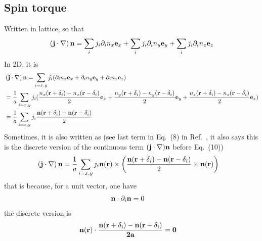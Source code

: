 \documentclass[aps,superscriptaddress,groupedaddress]{revtex4}  %
\begin{document}
\subsection{\label{sec:2.1}Spin torque}
Written in lattice, so that
\begin{equation}
\begin{split}
&\left({\bf j}\cdot \nabla\right) {\bf n}=\sum _i j_i\partial _i n_x{\bf e}_x+\sum _i j_i\partial _i n_y{\bf e}_y+\sum _i j_i\partial _i n_z{\bf e}_z\\
\end{split}
\end{equation}
In 2D, it is
\begin{equation}
\begin{split}
&\left({\bf j}\cdot \nabla\right) {\bf n}= \sum _{i=x,y}j_i(\partial _i n_x{\bf e}_x+ \partial _i n_y{\bf e}_y+\partial _i n_z{\bf e}_z)\\
&=\frac{1}{a}\sum _{i=x,y}j_i(\frac{n_{x}({\bf r}+\delta _i)-n_{x}({\bf r}-\delta _i)}{2}{\bf e}_x+ \frac{n_{y}({\bf r}+\delta _i)-n_{y}({\bf r}-\delta _i)}{2}{\bf e}_y+\frac{n_{z}({\bf r}+\delta _i)-n_{z}({\bf r}-\delta _i)}{2}{\bf e}_z)\\
&=\frac{1}{a}\sum _{i=x,y}j_i\frac{{\bf n}({\bf r}+\delta _i)-{\bf n}({\bf r}-\delta _i)}{2}
\end{split}
\end{equation}
Sometimes, it is also written as (see last term in Eq.~(8) in Ref.~\cite{pin}, it also says this is the discrete version of the continuous term $({\bf j}\cdot \nabla ){\bf n}$ before Eq.~(10))
\begin{equation}
\begin{split}
&\left({\bf j}\cdot \nabla\right) {\bf n}=\frac{1}{a}\sum _{i=x,y}j_i{\bf n}({\bf r})\times \left(\frac{{\bf n}({\bf r}+\delta _i)-{\bf n}({\bf r}-\delta _i)}{2}\times {\bf n}({\bf r})\right)
\end{split}
\end{equation}
that is because, for a unit vector, one have
\begin{equation}
\begin{split}
&{\bf n}\cdot \partial _i {\bf n}=0
\end{split}
\end{equation}
the discrete version is
\begin{equation}
\begin{split}
&{\bf n}(\bf {r})\cdot \frac{{\bf n}({\bf r}+\delta _i)-{\bf n}({\bf r}-\delta _i)}{2a}=0
\end{split}
\end{equation}
\end{document}
